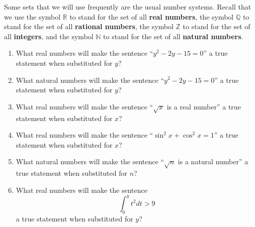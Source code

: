 \begin{previewactivity}[\textbf{Variables}]
Some sets that we will use frequently are the usual number systems.  Recall that we use the symbol  $\mathbb{R}$ to stand for the set of all \textbf{real numbers},
%
 the symbol  $\mathbb{Q}$ to stand for the set of all \textbf{rational numbers},
%
 the symbol  $\mathbb{Z}$ to stand for the set of all \textbf{integers},
%
 and the symbol $\mathbb{N}$ 
\label{sym:naturals}%
 to stand for the set of all 
\textbf{natural numbers}.
%


\setcounter{oldenumi}{\theenumi}
\begin{enumerate} \setcounter{enumi}{\theoldenumi}
  \item What real numbers will make the sentence ``$y^2 - 2y - 15 = 0$'' a true statement when substituted for  $y$?

  \item What natural numbers will make the sentence ``$y^2 - 2y - 15 = 0$'' a true statement when substituted for  $y$?

\item What real numbers will make the sentence ``$\sqrt{x}$  is a real number'' a true statement when substituted for $x$? \newpage

  \item What real numbers will make the sentence ``$\sin ^2 x + \cos ^2 x = 1$'' a true statement when substituted for  $x$?


  \item What natural numbers will make the sentence ``$\sqrt{n}$ is a natural number'' a true statement when substituted for $n$?

  \item What real numbers will make the sentence 
  \[
   \int_0^y {t^2 dt > 9}
  \]
   a true statement when substituted for  $y$?
\end{enumerate}
\end{previewactivity}
\hbreak
\endinput

